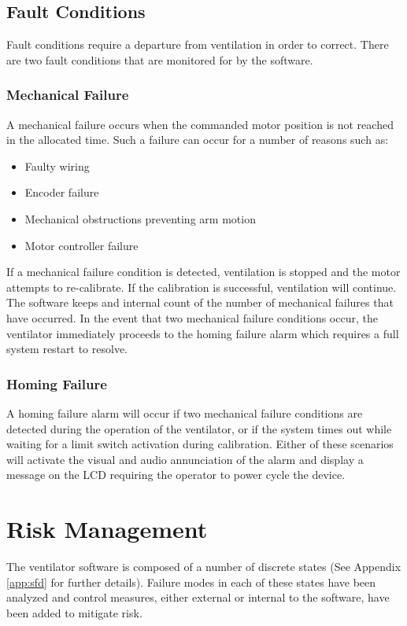 \documentclass[]{article}
\begin{document}
\subsection{Fault Conditions}
\label{sect:fault}

Fault conditions require a departure from ventilation in order to correct.  There are two fault conditions that are monitored for by the software.

\subsubsection{Mechanical Failure}
A mechanical failure occurs when the commanded motor position is not reached in the allocated time.  Such a failure can occur for a number of reasons such as:
\begin{itemize}
	\item Faulty wiring
	\item Encoder failure
	\item Mechanical obstructions preventing arm motion
	\item Motor controller failure
\end{itemize}
If a mechanical failure condition is detected, ventilation is stopped and the motor attempts to re-calibrate.  If the calibration is successful, ventilation will continue.  The software keeps and internal count of the number of mechanical failures that have occurred.  In the event that two mechanical failure conditions occur, the ventilator immediately proceeds to the homing failure alarm which requires a full system restart to resolve.

\subsubsection{Homing Failure}
A homing failure alarm will occur if two mechanical failure conditions are detected during the operation of the ventilator, or if the system times out while waiting for a limit switch activation during calibration.  Either of these scenarios will activate the visual and audio annunciation of the alarm and display a message on the LCD requiring the operator to power cycle the device.


\clearpage
\section{Risk Management}
\label{sect:risk}

The ventilator software is composed of a number of discrete states (See Appendix \ref{app:sfd} for further details). Failure modes in each of these states have been analyzed and control measures, either external or internal to the software, have been added to mitigate risk.
\end{document}
